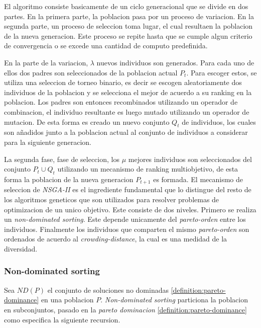 El algoritmo consiste basicamente de un ciclo generacional que se divide en dos partes. En la primera parte, la poblacion pasa por un proceso de variacion. En la segunda parte, un proceso de seleccion toma lugar, el cual resultaen la poblacion de la nueva generacion. Este proceso se repite hasta que se cumple algun criterio de convergencia o se excede una cantidad de computo predefinida.

En la parte de la variacion, $\lambda$ nuevos individuos son generados. Para cada uno de ellos dos padres son seleccionados de la poblacion actual $P_t$. Para escoger estos, se utiliza una seleccion de torneo binario, es decir se escogen aleatoriamente dos individuos de la poblacion y se selecciona el mejor de acuerdo a su ranking en la poblacion. Los padres son entonces recombinados utilizando un operador de combinacion, el individuo resultante es luego mutado utilizando un operador de mutacion. De esta forma es creado un nuevo conjunto $Q_t$ de individuos, los cuales son añadidos junto a la poblacion actual al conjunto de individuos a considerar para la siguiente generacion.

La segunda fase, fase de seleccion, los $\mu$ mejores individuos son seleccionados del conjunto $P_t \cup Q_t$ utilizando un mecanismo de ranking multiobjetivo, de esta forma la poblacion de la nueva generacion $P_{t+1}$ es formada. El mecanismo de seleccion de \emph{NSGA-II} es el ingrediente fundamental que lo distingue del resto de los algoritmos geneticos que son utilizados para resolver problemas de optimizacion de un unico objetivo. Este consiste de dos niveles. Primero se realiza un \emph{non-dominated sorting}. Este depende unicamente del \emph{pareto-orden} entre los individuos. Finalmente los individuos que comparten el mismo \emph{pareto-orden} son ordenados de acuerdo al \emph{crowding-distance}, la cual es una medidad de la diversidad.


\subsubsection{Non-dominated sorting}\label{section:ndsorting}

Sea $ND(P)$ el conjunto de soluciones no dominadas \ref{definition:pareto-dominance} en una poblacion $P$. \emph{Non-dominated sorting} particiona la poblacion en subconjuntos, pasado en la \emph{pareto dominacion} \ref{definition:pareto-dominance} como especifica la siguiente recursion.


